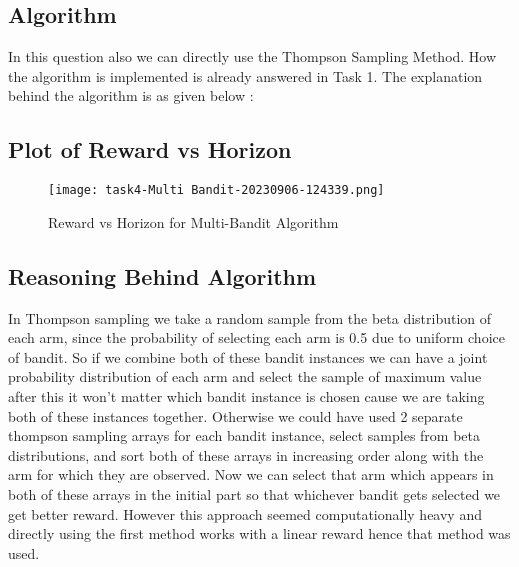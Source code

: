\documentclass{article}
\begin{document}
\subsection{Algorithm}
In this question also we can directly use the Thompson Sampling Method. How the algorithm is implemented is already answered in Task 1. The explanation behind the algorithm is as given below :

\subsection{Plot of Reward vs Horizon}
\begin{figure}[H]
\centering
\texttt{[image: task4-Multi Bandit-20230906-124339.png]}
\caption{Reward vs Horizon for Multi-Bandit Algorithm}
\end{figure}

\subsection{Reasoning Behind Algorithm}
In Thompson sampling we take a random sample from the beta distribution of each arm, since the probability of selecting each arm is 0.5 due to uniform choice of bandit. So if we combine both of these bandit instances we can have a joint probability distribution of each arm and select the sample of maximum value after this it won't matter which bandit instance is chosen cause we are taking both of these instances together. Otherwise we could have used 2 separate thompson sampling arrays for each bandit instance, select samples from beta distributions, and sort both of these arrays in increasing order along with the arm for which they are observed. Now we can select that arm which appears in both of these arrays in the initial part so that whichever bandit gets selected we get better reward. However this approach seemed computationally heavy and directly using the first method works with a linear reward hence that method was used.
\end{document}

